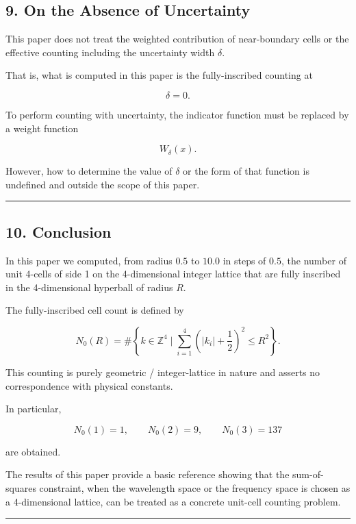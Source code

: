 \documentclass[
]{article}
\begin{document}
\subsection{9. On the Absence of
Uncertainty}\label{on-the-absence-of-uncertainty}

This paper does not treat the weighted contribution of near-boundary
cells or the effective counting including the uncertainty width
\(\delta\).

That is, what is computed in this paper is the fully-inscribed counting
at

\[
\delta=0 .
\]

To perform counting with uncertainty, the indicator function must be
replaced by a weight function

\[
W_\delta(x) .
\]

However, how to determine the value of \(\delta\) or the form of that
function is undefined and outside the scope of this paper.

\begin{center}\rule{0.5\linewidth}{0.5pt}\end{center}

\subsection{10. Conclusion}\label{conclusion}

In this paper we computed, from radius \(0.5\) to \(10.0\) in steps of
\(0.5\), the number of unit 4-cells of side 1 on the 4-dimensional
integer lattice that are fully inscribed in the 4-dimensional hyperball
of radius \(R\).

The fully-inscribed cell count is defined by

\[
N_0(R)
=
\#\left\{
k\in\mathbb{Z}^4
\mid
\sum_{i=1}^{4}
\left(|k_i|+\frac12\right)^2
\le R^2
\right\} .
\]

This counting is purely geometric / integer-lattice in nature and
asserts no correspondence with physical constants.

In particular,

\[
N_0(1)=1,\qquad
N_0(2)=9,\qquad
N_0(3)=137
\]

are obtained.

The results of this paper provide a basic reference showing that the
sum-of-squares constraint, when the wavelength space or the frequency
space is chosen as a 4-dimensional lattice, can be treated as a concrete
unit-cell counting problem.

\begin{center}\rule{0.5\linewidth}{0.5pt}\end{center}
\end{document}
